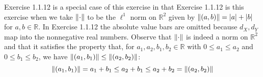 \documentclass[12pt]{amsart}
\begin{document}
Exercise 1.1.12 is a special case of this exercise in that Exercise 1.1.12 is this exercise when we take $\norm{\cdot}$ to be the $\ell^1$ norm on $\mathbb{R}^2$ given by $\norm{(a,b)} = \abs{a} + \abs{b}$ for $a,b\in \mathbb{R}$. In Exercise 1.1.12 the absolute value bars are omitted because $d_X, d_Y$ map into the nonnegative real numbers. Observe that $\norm{\cdot}$ is indeed a norm on $\mathbb{R}^2$ and that it satisfies the property that, for $a_1,a_2,b_1,b_2\in\mathbb{R}$ with $0\leq a_1\leq a_2$ and $0\leq b_1\leq b_2$, we have $\norm{(a_1,b_1)}\leq \norm{(a_2,b_2)}$: \[\norm{(a_1,b_1)} = a_1 + b_1 \leq a_2 + b_1 \leq a_2 + b_2 = \norm{(a_2,b_2)}\]
\end{document}
